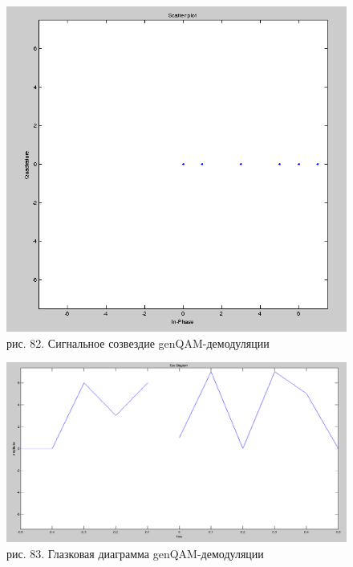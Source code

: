 \documentclass[10pt,a4paper]{report}
\begin{document}
\begin{figure}
\begin{center}
\includegraphics[width=150mm, scale = 0.9]{9_15}\newline
рис. 82. Сигнальное созвездие genQAM-демодуляции\newline
\end{center}
\end{figure}
\begin{figure}
\begin{center}
\includegraphics[width=150mm, scale = 0.9]{9_16}\newline
рис. 83. Глазковая диаграмма genQAM-демодуляции\newline
\end{center}
\end{figure}
\end{document}
